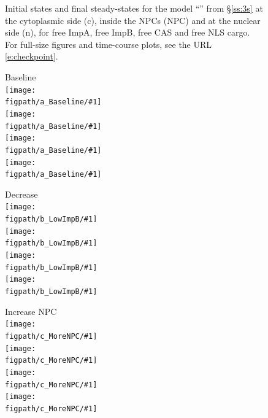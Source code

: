\documentclass[12pt,notitlepage]{article}
\def\[#1\]{\begin{align}#1\end{align}}
\begin{document}
\begin{figure}[!h]
	\vspace{\baselineskip}
		
	\caption{%
		Initial states and final steady-states for the model 
		``'' from \S\ref{ss:3s}
		at the cytoplasmic side (c),
		inside the NPCs (NPC)
		and 
		at the nuclear side (n),
		for 
		free ImpA, free ImpB, free CAS and free NLS cargo.
		For full-size figures and time-course plots, see the URL \eqref{e:checkpoint}.
	}
	\label{f:app:3s-plot1-ss}
\end{figure}

\clearpage

\begin{figure}[!h]
	\centering
	
	\vspace{-1\baselineskip}
	
	\newcommand{\figpath}{20211018-Appli/checkpoint/\checkpoint/plot_ss}
	\newcommand{\figures}{\fig{All ImpA}\\\fig{All ImpB}\\\fig{All CAS}\\\fig{All NLS}}
	
	\begin{minipage}{0.32\textwidth}
		\centering
		Baseline \\[0.5\baselineskip]
		\newcommand\fig[1]{\texttt{[image: \\figpath/a\_Baseline/\#1]}}
		\figures
	\end{minipage}
	\hfill
	\begin{minipage}{0.32\textwidth}
		\centering
		Decrease  \\[0.5\baselineskip]
		\newcommand\fig[1]{\texttt{[image: \\figpath/b\_LowImpB/\#1]}}
		\figures
	\end{minipage}
	\hfill
	\begin{minipage}{0.32\textwidth}
		\centering
		Increase NPC \\[0.5\baselineskip]
		\newcommand\fig[1]{\texttt{[image: \\figpath/c\_MoreNPC/\#1]}}
		\figures
	\end{minipage}
		
	\vspace{\baselineskip}
		

\end{figure}
\end{document}
